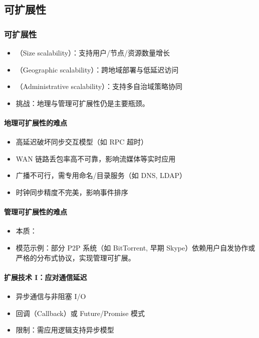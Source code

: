\subsection{可扩展性}

\subsubsection*{可扩展性}

\begin{itemize}
  \item {}（Size scalability）：支持用户/节点/资源数量增长
  \item {}（Geographic scalability）：跨地域部署与低延迟访问
  \item {}（Administrative scalability）：支持多自治域策略协同
  \item 挑战：地理与管理可扩展性仍是主要瓶颈。
\end{itemize}

\paragraph{地理可扩展性的难点}
\begin{itemize}
  \item 高延迟破坏同步交互模型（如 RPC 超时）
  \item WAN 链路丢包率高不可靠，影响流媒体等实时应用
  \item 广播不可行，需专用命名/目录服务（如 DNS, LDAP）
  \item 时钟同步精度不完美，影响事件排序
\end{itemize}

\paragraph{管理可扩展性的难点}
\begin{itemize}
  \item 本质：
  \item 模范示例：部分 P2P 系统（如 BitTorrent, 早期 Skype）依赖用户自发协作或严格的分布式协议，实现管理可扩展。
\end{itemize}

\paragraph{扩展技术 I：应对通信延迟}
\begin{itemize}
  \item 异步通信与非阻塞 I/O
  \item 回调（Callback）或 Future/Promise 模式
  \item 限制：需应用逻辑支持异步模型
\end{itemize}


